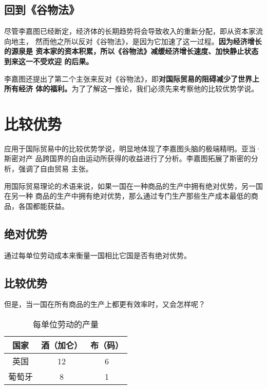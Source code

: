 \subsection{回到《谷物法》}

尽管李嘉图已经断定，经济体的长期趋势将会导致收入的重新分配，即从资本家流向地主，
然而他之所以反对《谷物法》，是因为它加速了这一过程。\textbf{因为经济增长的源泉是
  资本家的资本积累，所以《谷物法》减缓经济增长速度、加快静止状态到来这一不受欢迎
  的后果。}

李嘉图还提出了第二个主张来反对《谷物法》，即\textbf{对国际贸易的阻碍减少了世界上所有经济
体的福利。}为了了解这一推论，我们必须先来考察他的比较优势学说。

\section{比较优势}

应用于国际贸易中的比较优势学说，明显地体现了李嘉图头脑的极端精明。亚当·斯密对产
品跨国界的自由运动所获得的收益进行了分析。李嘉图拓展了斯密的分析，强调了自由贸易
主张。

用国际贸易理论的术语来说，如果一国在一种商品的生产中拥有绝对优势，另一国在另一种
商品的生产中拥有绝对优势，那么通过专门生产那些生产成本最低的商品，各国都能获益。

\subsection{绝对优势}

通过每单位劳动成本来衡量一国相比它国是否有绝对优势。

\subsection{比较优势}

但是，当一国在所有商品的生产上都更有效率时，又会怎样呢？

\begin{table}[htbp]
  \centering
  \caption{每单位劳动的产量}
  \label{tab:bijiaoyoushi}
    \begin{tabular}{@{}ccc@{}}
      \toprule
      \textbf{国家} & \textbf{酒（加仑）} & \textbf{布（码）}   \\ \midrule
      英国 & 12 & 6   \\
      葡萄牙& 8 &  1  \\ \bottomrule
    \end{tabular}%
\end{table}

